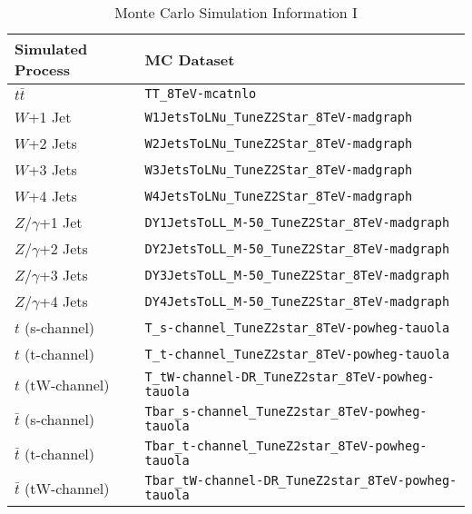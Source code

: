 \documentclass{cmspaperpdf}
\begin{document}
\begin{table}[h!]
\small
\caption{\small Monte Carlo Simulation Information I}
\centering
\begin{tabular}{| p{2.55 cm} |  p{10 cm} |}
\hline
\textbf{Simulated Process} & \textbf{MC Dataset} \\[0.5ex]
\hline
$\displaystyle{t\bar{t}}$                    & \texttt{TT\_8TeV-mcatnlo}               \\
$\displaystyle{W}$+1 Jet                & \texttt{W1JetsToLNu\_TuneZ2Star\_8TeV-madgraph}               \\
$\displaystyle{W}$+2 Jets               & \texttt{W2JetsToLNu\_TuneZ2Star\_8TeV-madgraph}               \\
$\displaystyle{W}$+3 Jets               & \texttt{W3JetsToLNu\_TuneZ2Star\_8TeV-madgraph}                \\
$\displaystyle{W}$+4 Jets               & \texttt{W4JetsToLNu\_TuneZ2Star\_8TeV-madgraph}                \\
$\displaystyle{Z/\gamma}$+1 Jet         & \texttt{DY1JetsToLL\_M-50\_TuneZ2Star\_8TeV-madgraph}          \\
$\displaystyle{Z/\gamma}$+2 Jets        & \texttt{DY2JetsToLL\_M-50\_TuneZ2Star\_8TeV-madgraph}         \\
$\displaystyle{Z/\gamma}$+3 Jets        & \texttt{DY3JetsToLL\_M-50\_TuneZ2Star\_8TeV-madgraph}         \\
$\displaystyle{Z/\gamma}$+4 Jets        & \texttt{DY4JetsToLL\_M-50\_TuneZ2Star\_8TeV-madgraph}          \\
$\displaystyle{t}$ (s-channel)          & \texttt{T\_s-channel\_TuneZ2star\_8TeV-powheg-tauola}          \\
$\displaystyle{t}$ (t-channel)          & \texttt{T\_t-channel\_TuneZ2star\_8TeV-powheg-tauola}         \\
$\displaystyle{t}$ (tW-channel)         & \texttt{T\_tW-channel-DR\_TuneZ2star\_8TeV-powheg-tauola}       \\
$\displaystyle{\bar{t}}$ (s-channel)    & \texttt{Tbar\_s-channel\_TuneZ2star\_8TeV-powheg-tauola}       \\
$\displaystyle{\bar{t}}$ (t-channel)    & \texttt{Tbar\_t-channel\_TuneZ2star\_8TeV-powheg-tauola}        \\
$\displaystyle{\bar{t}}$ (tW-channel)   & \texttt{Tbar\_tW-channel-DR\_TuneZ2star\_8TeV-powheg-tauola}    \\
\hline
\end{tabular}
\label{tab:sim_samples}
\end{table}
\end{document}
